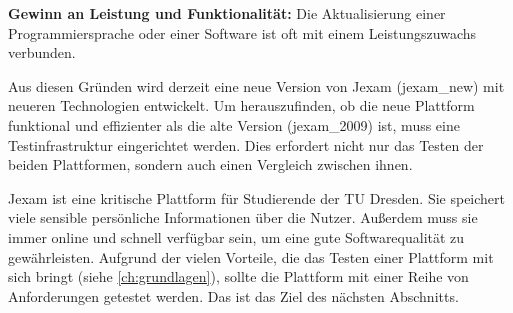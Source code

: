 \textbf{Gewinn an Leistung und Funktionalität:} Die Aktualisierung einer
Programmiersprache oder einer Software ist oft mit einem
Leistungszuwachs verbunden.

Aus diesen Gründen wird derzeit eine neue Version von Jexam (\Gls{jexam_new})
mit neueren Technologien entwickelt. Um herauszufinden, ob die neue
Plattform funktional und effizienter als die alte Version (\Gls{jexam_2009})
ist, muss eine Testinfrastruktur eingerichtet werden. Dies erfordert
nicht nur das Testen der beiden Plattformen, sondern auch einen Vergleich
zwischen ihnen.


Jexam ist eine kritische Plattform für Studierende der TU Dresden.
Sie speichert viele sensible persönliche Informationen über die
Nutzer. Außerdem muss sie immer online und schnell verfügbar sein,
um eine gute Softwarequalität zu gewährleisten. Aufgrund der vielen
Vorteile, die das Testen einer Plattform mit sich bringt
(siehe \autoref{ch:grundlagen}), sollte die Plattform mit einer Reihe von
Anforderungen getestet werden. Das ist das Ziel des nächsten Abschnitts.